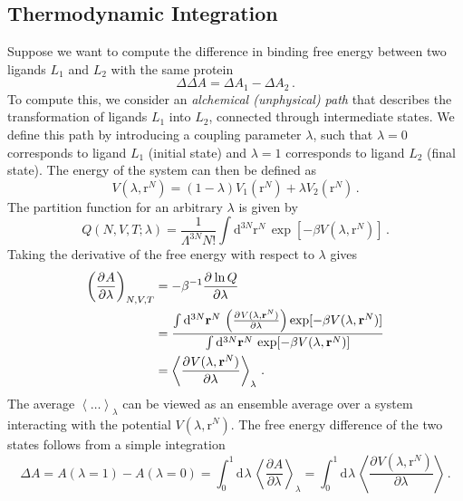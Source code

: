 \documentclass{article}
\theoremstyle{plain}\theoremheaderfont{\normalfont\itshape}\theorembodyfont{\rmfamily}\theoremseparator{.}\newtheorem*{rem}{Remark}\newtheorem*{ex}{Example}\newtheorem*{proof}{Proof}\newtheorem*{altp}{Alternative proof}
\theoremstyle{plain}\theoremheaderfont{\normalfont\bfseries}\theorembodyfont{\rmfamily}\theoremseparator{.}\newtheorem{thm}{Theorem}[section]\newtheorem{lem}[thm]{Lemma}\newtheorem{prop}[thm]{Proposition}\newtheorem*{cor}{Corollary}\newtheorem{defn}[thm]{Definition}\newtheorem{clm}[thm]{Claim}\newtheorem{clminproof}{Claim}\newtheorem{alg}[thm]{Algorithm}\newtheorem{hyp}[thm]{Hypothesis}\newtheorem{law}[thm]{Law}
\theoremstyle{break}\theoremheaderfont{\normalfont\itshape}\theorembodyfont{\rmfamily}\theoremseparator{.\medskip}\newtheorem*{proofskip}{Proof}\newtheorem*{exs}{Examples}\newtheorem*{rems}{Remarks}
\theoremstyle{break}\theoremheaderfont{\normalfont\bfseries}\theorembodyfont{\rmfamily}\theoremseparator{.\medskip}\newtheorem{lemskip}[thm]{Lemma}\newtheorem{defnskip}[thm]{Definition}\newtheorem{propskip}[thm]{Proposition}\newtheorem{thmskip}[thm]{Theorem}
\numberwithin{equation}{section}
\newcommand{\dd}[2][]{\mathrm{d}^{#1} #2\,}
\newcommand{\pdv}[3][]{\frac{\partial^{#1} #2}{{\partial #3}^{#1}}}
\newcommand{\eval}[1]{\left\langle #1 \right\rangle}
\newcommand{\vb}[1]{\bm{\mathrm{#1}}}
\begin{document}
    \subsection{Thermodynamic Integration}
    Suppose we want to compute the difference in binding free energy between two ligands \(L_1\) and \(L_2\) with the same protein
    \begin{equation}
        \Delta\Delta A=\Delta A_1-\Delta A_2\,.
    \end{equation}
    To compute this, we consider an \textit{alchemical (unphysical) path} that describes the transformation of ligands \(L_1\) into \(L_2\), connected through intermediate states. We define this path by introducing a coupling parameter \(\lambda\), such that \(\lambda=0\) corresponds to ligand \(L_1\) (initial state) and \(\lambda=1\) corresponds to ligand \(L_2\) (final state). The energy of the system can then be defined as
    \begin{equation}
        V(\lambda,\vb{r}^N)=(1-\lambda)V_1(\vb{r}^N)+\lambda V_2(\vb{r}^N)\,.
    \end{equation}
    The partition function for an arbitrary \(\lambda\) is given by
    \begin{equation}
        Q(N,V,T;\lambda)=\frac{1}{\Lambda^{3N}N!}\int\dd[3N]{\vb{r}^N}\exp[-\beta V(\lambda,\vb{r}^N)]\,.
    \end{equation}
    Taking the derivative of the free energy with respect to \(\lambda\) gives
    \begin{align}
        \left(\pdv{A}{\lambda}\right)_{N,V,T}&=-\beta^{-1}\pdv{\ln Q}{\lambda}\notag\\
        &=\frac{\int\dd[3N]{\vb{r}^N}\left(\pdv{V(\lambda,\vb{r}^N)}{\lambda}\right)\exp[-\beta V(\lambda,\vb{r}^N)]}{\int\dd[3N]{\vb{r}^N}\exp[-\beta V(\lambda,\vb{r}^N)]}\notag\\
        &=\eval{\pdv{V(\lambda,\vb{r}^N)}{\lambda}}_\lambda\,.
    \end{align}
    The average \(\eval{\dots}_\lambda\) can be viewed as an ensemble average over a system interacting with the potential \(V(\lambda,\vb{r}^N)\). The free energy difference of the two states follows from a simple integration
    \begin{equation}
        \Delta A=A(\lambda=1)-A(\lambda=0)=\int_{0}^{1}\dd{\lambda}\eval{\pdv{A}{\lambda}}_\lambda=\int_0^1\dd{\lambda}\eval{\pdv{V(\lambda,\vb{r}^N)}{\lambda}}\,.
    \end{equation}
\end{document}
